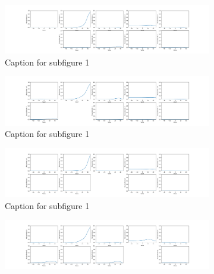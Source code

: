     \clearpage
    \begin{figure}[htb!]
        \centering
        \begin{subfigure}[b]{\textwidth}
            \centering
            \includegraphics[width=\textwidth]{chapters/results/CNN/Shade/acc6.png}
            \caption{Caption for subfigure 1}
            \label{fig:Shade-misclass0}
        \end{subfigure}
        \begin{subfigure}[b]{\textwidth}
            \centering
            \includegraphics[width=\textwidth]{chapters/results/CNN/Shade/acc7.png}
            \caption{Caption for subfigure 1}
            \label{fig:Shade-misclass0}
        \end{subfigure}
        \begin{subfigure}[b]{\textwidth}
            \centering
            \includegraphics[width=\textwidth]{chapters/results/CNN/Shade/acc8.png}
            \caption{Caption for subfigure 1}
            \label{fig:Shade-misclass0}
        \end{subfigure}
        \begin{subfigure}[b]{\textwidth}
            \centering
            \includegraphics[width=\textwidth]{chapters/results/CNN/Shade/acc9.png}

\end{subfigure}
\end{figure}
